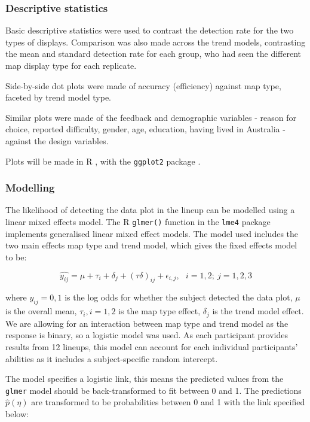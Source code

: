 \documentclass{monashthesis}
\begin{document}
\hypertarget{descriptive-statistics}{%
\subsubsection{Descriptive statistics}\label{descriptive-statistics}}

Basic descriptive statistics were used to contrast the detection rate for the two types of displays. Comparison was also made across the trend models, contrasting the mean and standard detection rate for each group, who had seen the different map display type for each replicate.

Side-by-side dot plots were made of accuracy (efficiency) against map type, faceted by trend model type.

Similar plots were made of the feedback and demographic variables - reason for choice, reported difficulty, gender, age, education, having lived in Australia - against the design variables.

Plots will be made in R \autocite{R}, with the \texttt{ggplot2} package \autocite{ggplot2}.

\hypertarget{modelling}{%
\subsubsection{Modelling}\label{modelling}}

The likelihood of detecting the data plot in the lineup can be modelled using a linear mixed effects model.
The R \autocite{R} \texttt{glmer()} function in the \texttt{lme4} \autocite{lme4} package implements generalised linear mixed effect models. The model used includes the two main effects map type and trend model, which gives the fixed effects model to be:

\[\widehat{y_{ij}} = \mu + \tau_i + \delta_j + (\tau\delta)_{ij} + \epsilon_{i,j}, ~~~ i=1,2; ~j=1,2,3\]

where \(y_{ij} = 0, 1\) is the log odds for whether the subject detected the data plot, \(\mu\) is the overall mean, \(\tau_i, i=1,2\) is the map type effect, \(\delta_j\) is the trend model effect. We are allowing for an interaction between map type and trend model as the response is binary, so a logistic model was used. As each participant provides results from 12 lineups, this model can account for each individual participants' abilities as it includes a subject-specific random intercept.

The model specifies a logistic link, this means the predicted values from the \texttt{glmer} model should be back-transformed to fit between 0 and 1. The predictions \(\widehat{p}(\eta)\) are transformed to be probabilities between 0 and 1 with the link specified below:
\end{document}
